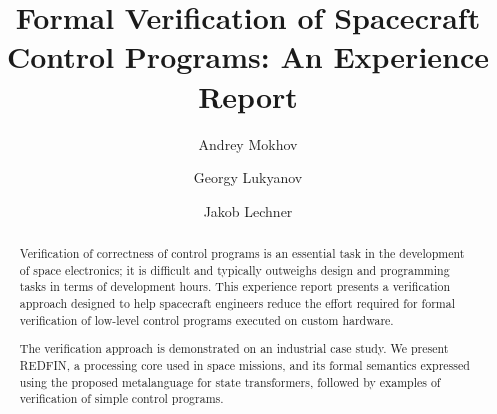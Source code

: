 \documentclass[sigplan,10pt,review,anonymous]{acmart}
\begin{document}
\title[Formal Verification of Spacecraft Control Programs]{Formal Verification
of Spacecraft Control Programs: An Experience Report}

\author{Andrey Mokhov}
\author{Georgy Lukyanov}
\author{Jakob Lechner}


\begin{abstract}
Verification of correctness of control programs is an essential task
in the development of space electronics; it is difficult and typically
outweighs design and programming tasks in terms of development hours.
This experience report presents a verification approach designed to help
spacecraft engineers reduce the effort required for formal verification of
low-level control programs executed on custom hardware.


The verification approach is demonstrated on an industrial case study.
We present REDFIN, a processing core used in space missions, and its formal
semantics expressed using the proposed metalanguage for state transformers,
followed by examples of verification of simple control programs.

\end{abstract}

\maketitle
\end{document}
